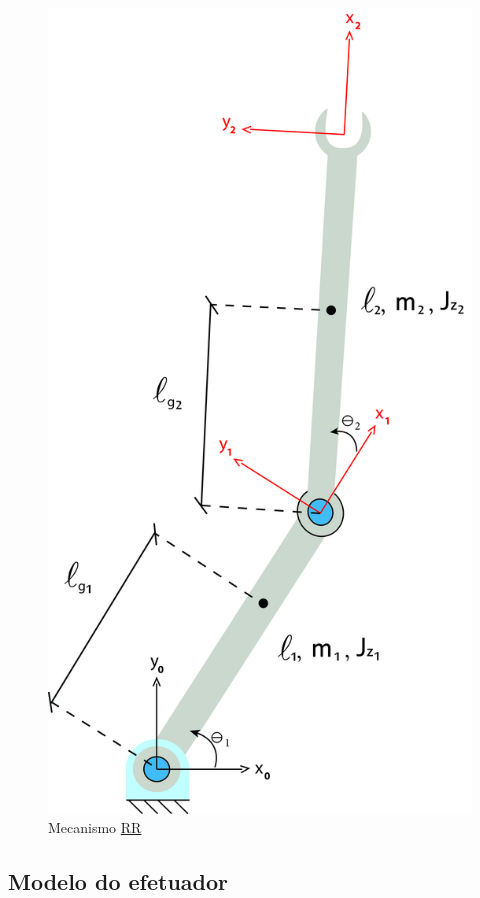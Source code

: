 \documentclass[]{politex}
\begin{document}
\begin{figure}[h]
	\centering
	\includegraphics[scale=0.055]{../figures/RR.jpg}  
	\caption{Mecanismo \underline{R}\underline{R}}
	\label{fig:RR}
\end{figure}



\subsection{Modelo do efetuador}
\end{document}
